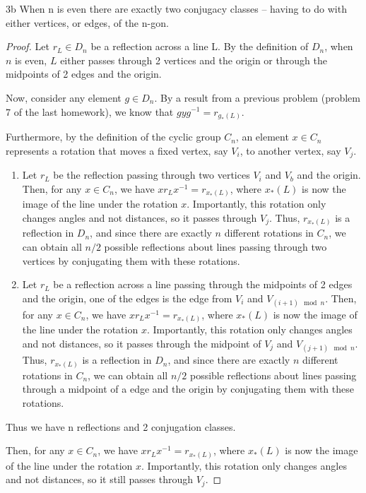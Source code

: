 \documentclass{article}
\begin{document}
\begin{claim}{3b}
    When n is even there are exactly two conjugacy classes -- having to do with either vertices, or edges, of the n-gon. 
\end{claim}
\begin{proof}
    Let $r_L \in D_n$ be a reflection across a line L. By the definition of $D_n$, when $n$ is even, $L$ either passes through 2 vertices and the origin or through the midpoints of 2 edges and the origin.

    Now, consider any element $g \in D_n$. By a result from a previous problem (problem 7 of the last homework), we know that $gyg^{-1} = r_{g_*(L)}$.

    Furthermore, by the definition of the cyclic group $C_n$, an element $x \in C_n$ represents a rotation that moves a fixed vertex, say $V_i$, to another vertex, say $V_j$. 
    
    \begin{enumerate}{}
        \item Let $r_L$ be the reflection passing through two vertices $V_i$ and $V_b$ and the origin. Then, for any $x \in C_n$, we have $xr_Lx^{-1} = r_{x_*(L)}$, where $x_*(L)$ is now the image of the line under the rotation $x$. Importantly, this rotation only changes angles and not distances, so it passes through $V_j$. Thus, $r_{x_*(L)}$ is a reflection in $D_n$, and since there are exactly $n$ different rotations in $C_n$, we can obtain all $n/2$ possible reflections about lines passing through two vertices by conjugating them with these rotations.
        \item Let $r_L$ be a reflection across a line passing through the midpoints of 2 edges and the origin, one of the edges is the edge from $V_i$ and $V_{(i + 1) \mod n}$. Then, for any $x \in C_n$, we have $xr_Lx^{-1} = r_{x_*(L)}$, where $x_*(L)$ is now the image of the line under the rotation $x$. Importantly, this rotation only changes angles and not distances, so it passes through the midpoint of $V_{j}$ and $V_{(j + 1) \mod n}$. Thus, $r_{x_*(L)}$ is a reflection in $D_n$, and since there are exactly $n$ different rotations in $C_n$, we can obtain all $n/2$ possible reflections about lines passing through a midpoint of a edge and the origin by conjugating them with these rotations.
    \end{enumerate}

    Thus we have n reflections and 2 conjugation classes.
    
    Then, for any $x \in C_n$, we have $xr_Lx^{-1} = r_{x_*(L)}$, where $x_*(L)$ is now the image of the line under the rotation $x$. Importantly, this rotation only changes angles and not distances, so it still passes through $V_j$.

\end{proof}
\end{document}
